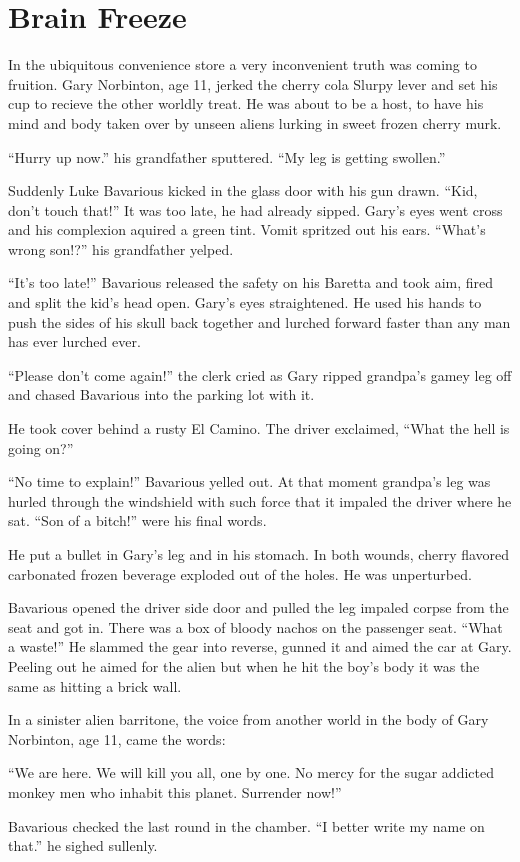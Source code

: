 \chapter{Brain Freeze}

In the ubiquitous convenience store a very inconvenient truth was coming
to fruition. Gary Norbinton, age 11, jerked the cherry cola Slurpy lever
and set his cup to recieve the other worldly treat. He was about to be a
host, to have his mind and body taken over by unseen aliens lurking in
sweet frozen cherry murk.

``Hurry up now.'' his grandfather sputtered. ``My leg is getting
swollen.''

Suddenly Luke Bavarious kicked in the glass door with his gun
drawn. ``Kid, don't touch that!'' It was too late, he had already
sipped. Gary's eyes went cross and his complexion aquired a green
tint. Vomit spritzed out his ears. ``What's wrong son!?'' his
grandfather yelped.

``It's too late!'' Bavarious released the safety on his Baretta and took
aim, fired and split the kid's head open. Gary's eyes straightened. He
used his hands to push the sides of his skull back together and lurched
forward faster than any man has ever lurched ever.

``Please don't come again!'' the clerk cried as Gary ripped grandpa's
gamey leg off and chased Bavarious into the parking lot with it.

He took cover behind a rusty El Camino. The driver exclaimed, ``What the
hell is going on?''

``No time to explain!'' Bavarious yelled out. At that moment grandpa's
leg was hurled through the windshield with such force that it impaled
the driver where he sat. ``Son of a bitch!'' were his final words.

He put a bullet in Gary's leg and in his stomach. In both wounds, cherry
flavored carbonated frozen beverage exploded out of the holes. He was
unperturbed.

Bavarious opened the driver side door and pulled the leg impaled corpse
from the seat and got in. There was a box of bloody nachos on the
passenger seat. ``What a waste!'' He slammed the gear into reverse,
gunned it and aimed the car at Gary. Peeling out he aimed for the alien
but when he hit the boy's body it was the same as hitting a brick wall.

In a sinister alien barritone, the voice from another world in the body
of Gary Norbinton, age 11, came the words:

``We are here. We will kill you all, one by one. No mercy for the sugar
addicted monkey men who inhabit this planet. Surrender now!''

Bavarious checked the last round in the chamber. ``I better write my
name on that.'' he sighed sullenly.

